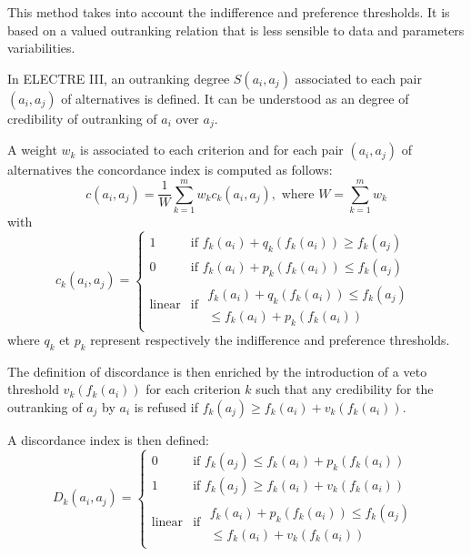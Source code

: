 \begin{enumerate}
This method takes into account the indifference and preference thresholds. It is based on a valued outranking relation that is less sensible to data and parameters variabilities.

In ELECTRE III, an outranking degree $S(a_i, a_j)$ associated to each pair $(a_i, a_j)$ of alternatives is defined. It can be understood as an \og degree of credibility of outranking \fg of $a_i$ over $a_j$.

A weight $w_{k}$ is associated to each criterion and for each pair $(a_i, a_j)$ of alternatives the concordance index is computed as follows:
\begin{equation}
c(a_i, a_j) = \frac{1}{W} \sum_{k=1}^{m} w_{k} c_{k}(a_i, a_j), \text{ where } W = \sum_{k=1}^{m} w_{k}
\end{equation}
with
\begin{equation}
c_{k}(a_i,a_j) = \begin{cases}
	1& \text{if } f_{k}(a_i)+q_{k}(f_{k}(a_i)) \geq f_{k}(a_j)\\
	0& \text{if } f_{k}(a_i)+p_{k}(f_{k}(a_i)) \leq f_{k}(a_j)\\
	\text{linear}& \text{if } \begin{array}{rr} f_{k}(a_i)+q_{k}(f_{k}(a_i)) \leq f_{k}(a_j)\\
	\leq f_{k}(a_i)+p_{k}(f_{k}(a_i)) \end{array}
	\end{cases}
\end{equation}
where $q_{k}$ et $p_{k}$ represent respectively the indifference and preference thresholds.

The definition of discordance is then enriched by the introduction of a veto threshold $v_k(f_k(a_i))$ for each criterion $k$ such that any credibility for the outranking of $a_j$ by $a_i$ is refused if $f_k(a_j) \geq f_k(a_i) + v_k(f_k(a_i))$.

A discordance index is then defined:
\begin{equation}
D_k(a_i, a_j) = \begin{cases}
	0 & \text{if } f_k(a_j) \leq f_k(a_i) + p_k(f_k(a_i))\\
	1 & \text{if } f_k(a_j) \geq f_k(a_i) + v_k(f_k(a_i))\\
	\text{linear} & \text{if } \begin{array}{rr} f_k(a_i) + p_k(f_k(a_i)) \leq f_k(a_j)\\
	\leq f_k(a_i) + v_k(f_k(a_i)) \end{array}
	\end{cases}
\end{equation}


\end{enumerate}
